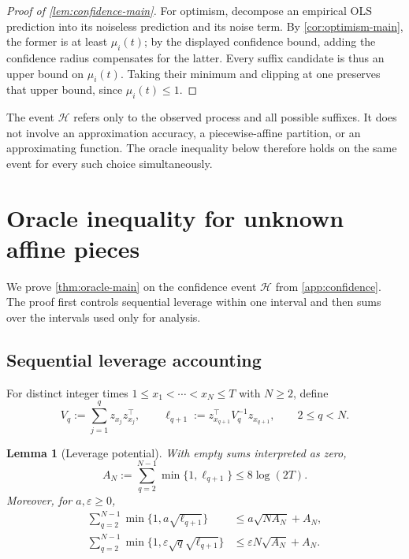 \documentclass[11pt]{article}
\newtheorem{lemma}[lemma]{Lemma}
\theoremstyle{remark}
\begin{document}
\begin{proof}[Proof of \cref{lem:confidence-main}]
For optimism, decompose an empirical OLS prediction into its noiseless
prediction and its noise term. By \cref{cor:optimism-main}, the former is at
least $\mu_i(t)$; by the displayed confidence bound, adding the confidence
radius compensates for the latter. Every suffix candidate is thus an upper
bound on $\mu_i(t)$. Taking their minimum and clipping at one preserves that
upper bound, since $\mu_i(t)\le1$.
\end{proof}

The event $\mathcal H$ refers only to the observed process and all possible
suffixes. It does not involve an approximation accuracy, a piecewise-affine
partition, or an approximating function. The oracle inequality below
therefore holds on the same event for every such choice simultaneously.

\section{Oracle inequality for unknown affine pieces}\label{app:oracle}

We prove \cref{thm:oracle-main} on the confidence event $\mathcal H$ from
\cref{app:confidence}. The proof first controls sequential leverage within one
interval and then sums over the intervals used only for analysis.

\subsection{Sequential leverage accounting}

For distinct integer times $1\le x_1<\cdots<x_N\le T$ with $N\ge2$, define
\[
V_q:=\sum_{j=1}^qz_{x_j}z_{x_j}^\top,
\qquad
\ell_{q+1}:=z_{x_{q+1}}^\top V_q^{-1}z_{x_{q+1}},
\qquad 2\le q<N.
\]

\begin{samepage}
\begin{lemma}[Leverage potential]\label{lem:leverage-app}
With empty sums interpreted as zero,
\begin{equation}\label{eq:leverage-potential-app}
A_N:=\sum_{q=2}^{N-1}\min\{1,\ell_{q+1}\}
\le8\log(2T).
\end{equation}
Moreover, for $a,\varepsilon\ge0$,
\begin{align}
\sum_{q=2}^{N-1}\min\{1,a\sqrt{\ell_{q+1}}\}
&\le a\sqrt{NA_N}+A_N,
\label{eq:leverage-sqrt-app}\\
\sum_{q=2}^{N-1}
\min\{1,\varepsilon\sqrt q\sqrt{\ell_{q+1}}\}
&\le\varepsilon N\sqrt{A_N}+A_N.
\label{eq:leverage-weighted-app}
\end{align}
\end{lemma}
\end{samepage}
\end{document}
